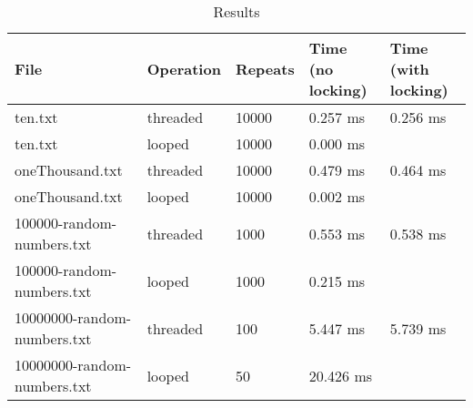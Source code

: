 \documentclass{assignment-x}
\begin{document}
\pagebreak

\begin{table}[htbp]
    \centering
    \begin{tabular}{|l|l|l|l|l|}
        \hline
        \textbf{File} & \textbf{Operation} & \textbf{Repeats} & \textbf{Time (no locking)} & \textbf{Time (with locking)} \\
        \hline
        ten.txt & threaded & 10000 & 0.257 ms & 0.256 ms \\
        ten.txt & looped & 10000 & 0.000 ms & \\
        oneThousand.txt & threaded & 10000 & 0.479 ms & 0.464 ms \\
        oneThousand.txt & looped & 10000 & 0.002 ms & \\
        100000-random-numbers.txt & threaded & 1000 & 0.553 ms & 0.538 ms \\
        100000-random-numbers.txt & looped & 1000 & 0.215 ms & \\
        10000000-random-numbers.txt & threaded & 100 & 5.447 ms & 5.739 ms \\
        10000000-random-numbers.txt & looped & 50 & 20.426 ms & \\
        \hline
    \end{tabular}
    \caption{Results}
    \label{tab:my_table}
\end{table}
\end{document}
